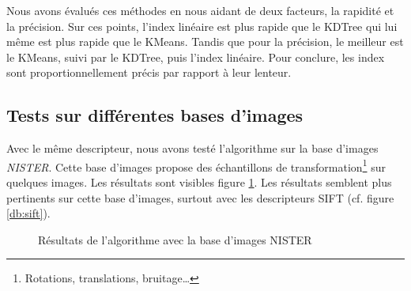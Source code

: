 \documentclass[a4paper]{article}
\begin{document}
Nous avons évalués ces méthodes en nous aidant de deux facteurs, la rapidité et la précision.
Sur ces points, l'index linéaire est plus rapide que le KDTree qui lui même est plus rapide que le KMeans.
Tandis que pour la précision, le meilleur est le KMeans, suivi par le KDTree, puis l'index linéaire.
Pour conclure, les index sont proportionnellement précis par rapport à leur lenteur.



\subsection{Tests sur différentes bases d'images}

Avec le même descripteur, nous avons testé l'algorithme sur la base d'images {\em NISTER}. Cette base
d'images propose des échantillons de transformation\footnote{Rotations, translations, bruitage\ldots} sur quelques images.
Les résultats sont visibles figure \ref{db}. Les résultats semblent plus pertinents sur cette base d'images,
surtout avec les descripteurs SIFT (cf. figure \ref{db:sift}).

\begin{figure}[!ht]%
  \centering
  \hspace{0.01\textwidth}
  \caption{Résultats de l'algorithme avec la base d'images NISTER}
  \label{db}
\end{figure}
\end{document}
